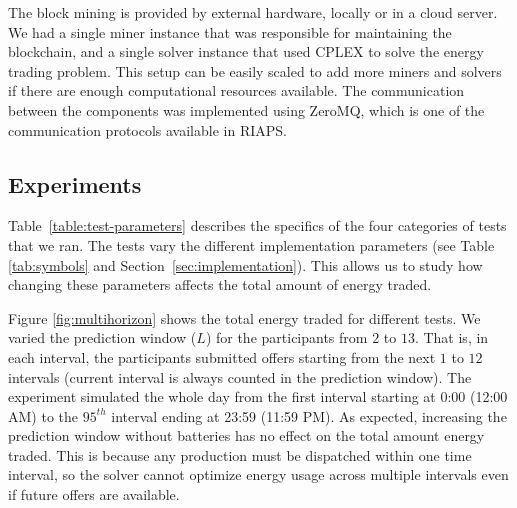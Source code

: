 The block mining is provided by external hardware, locally or in a cloud server. We had a single miner instance that was responsible for maintaining the blockchain, and a single solver instance that used CPLEX \cite{cplex2009v12} to solve the energy trading problem. This setup can be easily scaled to add more miners and solvers if there are enough computational resources available. The communication between the components was implemented using ZeroMQ, which is one of the communication protocols available in RIAPS. 









\subsection{Experiments}
Table~\ref{table:test-parameters} describes the specifics of the four categories of tests that we ran. The tests vary the different implementation parameters (see Table \ref{tab:symbols} and Section~\ref{sec:implementation}). This allows us to study how changing these parameters affects the total amount of energy traded. 

Figure \ref{fig:multihorizon} shows the total energy traded for different tests. We varied the prediction window ($L$) for the participants from $2$ to $13$. That is, in each interval, the participants submitted offers starting from the next $1$ to $12$ intervals (current interval is always counted in the prediction window). The experiment simulated the whole day from the first interval starting at 0:00 (12:00 AM) to the $95^{th}$ interval ending at 23:59 (11:59 PM). %
%
As expected, increasing the prediction window without batteries has no effect on the total amount energy traded. This is because any production must be dispatched within one time interval, so the solver cannot optimize energy usage across multiple intervals even if future offers are available. %

